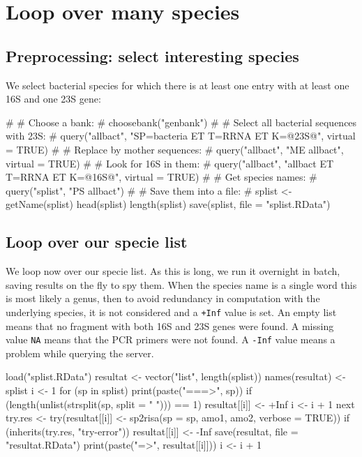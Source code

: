 \documentclass{article}
\begin{document}
\section{Loop over many species}

\subsection{Preprocessing: select interesting species}

We select bacterial species for which there is at least one
entry with at least one 16S and one 23S gene:

\begin{Schunk}
\begin{Sinput}
 #
 # Choose a bank:
 #
 choosebank("genbank")
 #
 # Select all bacterial sequences with 23S:
 #
 query("allbact", "SP=bacteria ET T=RRNA ET K=@23S@", virtual = TRUE)
 #
 # Replace by mother sequences:
 #
 query("allbact", "ME allbact", virtual = TRUE)
 #
 # Look for 16S in them:
 #
 query("allbact", "allbact ET T=RRNA ET K=@16S@", virtual = TRUE)
 #
 # Get species names:
 #
 query("splist", "PS allbact")
 #
 # Save them into a file:
 #
 splist <- getName(splist)
 head(splist)
 length(splist)
 save(splist, file = "splist.RData")
\end{Sinput}
\end{Schunk}

\subsection{Loop over our specie list}

We loop now over our specie list. As this is long, we run
it overnight in batch, saving results on the fly to spy them.
When the species name is a single word this is most likely a genus,
then to avoid redundancy in computation with the underlying species,
it is not considered and a \texttt{+Inf} value is set. An empty list
means that no fragment with both 16S and 23S genes were found. A
missing value \texttt{NA} means that the PCR primers were not found.
A \texttt{-Inf} value means a problem while querying the server.

\begin{Schunk}
\begin{Sinput}
 load("splist.RData")
 resultat <- vector("list", length(splist))
 names(resultat) <- splist
 i <- 1
 for (sp in splist) {
     print(paste("===>", sp))
     if (length(unlist(strsplit(sp, split = " "))) == 1) {
         resultat[[i]] <- +Inf
         i <- i + 1
         next
     }
     try.res <- try(resultat[[i]] <- sp2risa(sp = sp, amo1, 
         amo2, verbose = TRUE))
     if (inherits(try.res, "try-error")) 
         resultat[[i]] <- -Inf
     save(resultat, file = "resultat.RData")
     print(paste("=>", resultat[[i]]))
     i <- i + 1
 }
\end{Sinput}
\end{Schunk}
\end{document}
